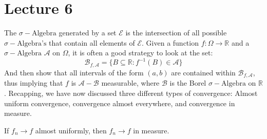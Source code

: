 \section{Lecture 6}
    The $\sigma-\textrm{Algebra}$ generated by
    a set $\mathcal{E}$ is the intersection of all
    possible $\sigma-\textrm{Algebra's}$ that contain
    all elements of $\mathcal{E}$. Given a function
    $f:\Omega\rightarrow\mathbb{R}$ and a
    $\sigma-\textrm{Algebra}$ $\mathcal{A}$ on
    $\Omega$, it is often a good strategy to look at
    the set:
    \begin{equation}
        \mathcal{B}_{f,\mathcal{A}}=
            \big\{
                B\subseteq\mathbb{R}:
                f^{-1}(B)\in\mathcal{A}
            \big\}
    \end{equation}
    And then show that all intervals of the form
    $(a,b)$ are contained within
    $\mathcal{B}_{f,\mathcal{A}}$, thus implying
    that $f$ is $\mathcal{A}-\mathcal{B}$ measurable,
    where $\mathcal{B}$ is the Borel
    $\sigma-\textrm{Algebra}$ on $\mathbb{R}$.
    Recapping, we have now discussed three different
    types of convergence: Almost uniform convergence,
    convergence almost everywhere, and convergence in
    measure.
    \begin{theorem}
        If $f_{n}\rightarrow{f}$ almost uniformly,
        then $f_{n}\rightarrow{f}$ in measure.
    \end{theorem}
